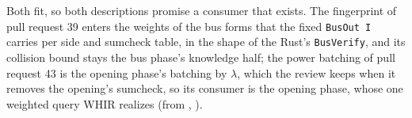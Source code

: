 \begin{sloppypar}
Both fit, so both descriptions promise a consumer that exists. The fingerprint of pull request 39 enters the weights of the bus forms that the fixed \texttt{BusOut I} carries per side and sumcheck table, in the shape of the Rust's \texttt{BusVerify}, and its collision bound stays the bus phase's knowledge half; the power batching of pull request 43 is the opening phase's batching by $λ$, which the review keeps when it removes the opening's sumcheck, so its consumer is the opening phase, whose one weighted query WHIR realizes (from , ).
\end{sloppypar}
